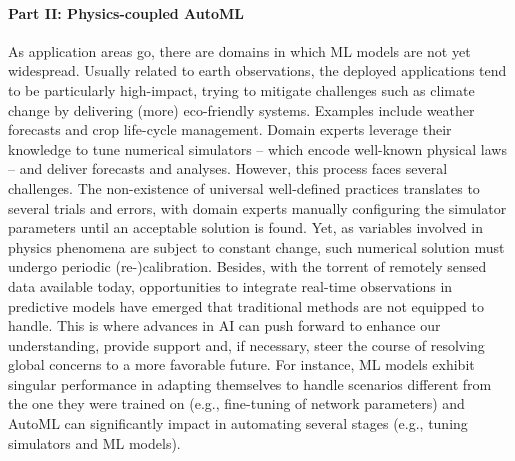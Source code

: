 \paragraph{Part II: Physics-coupled AutoML}

As application areas go, there are domains in which ML models are not yet widespread.
Usually related to earth observations, the deployed applications tend to be particularly high-impact, trying to mitigate challenges such as climate change by delivering (more) eco-friendly systems.
Examples include weather forecasts and crop life-cycle management.
Domain experts leverage their knowledge to tune numerical simulators -- which encode well-known physical laws -- and deliver forecasts and analyses.
However, this process faces several challenges.
The non-existence of universal well-defined practices translates to several trials and errors, with domain experts manually configuring the simulator parameters until an acceptable solution is found.
Yet, as variables involved in physics phenomena are subject to constant change, such numerical solution must undergo periodic (re-)calibration.
Besides, with the torrent of remotely sensed data available today, opportunities to integrate real-time observations in predictive models have emerged that traditional methods are not equipped to handle.
This is where advances in AI can push forward to enhance our understanding, provide support and, if necessary, steer the course of resolving global concerns to a more favorable future.
For instance, ML models exhibit singular performance in adapting themselves to handle scenarios different from the one they were trained on (e.g., fine-tuning of network parameters) and AutoML can significantly impact in automating several stages (e.g., tuning simulators and ML models).

